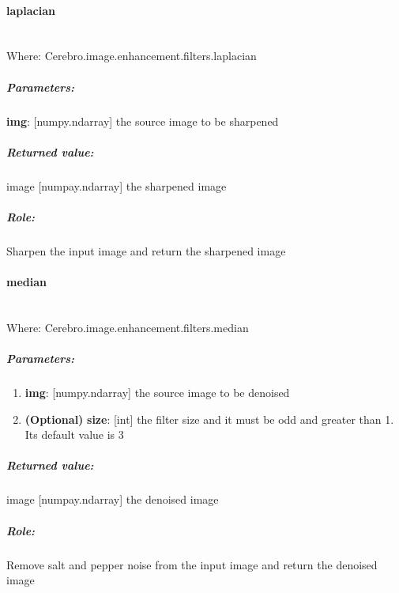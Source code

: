 \paragraph{laplacian} \mbox{} \\
Where: Cerebro.image.enhancement.filters.laplacian
\subparagraph{Parameters:}
\begin{changemargin}{1cm}{0cm}
	\textbf{img}: [numpy.ndarray] the source image to be sharpened
\end{changemargin}

\subparagraph{Returned value:}
\begin{changemargin}{1cm}{0cm}
	image [numpay.ndarray] the sharpened image
\end{changemargin}

\subparagraph{Role:}
\begin{changemargin}{1cm}{0cm}
	Sharpen the input image and return the sharpened image
\end{changemargin}


\paragraph{median} \mbox{} \\
Where: Cerebro.image.enhancement.filters.median
\subparagraph{Parameters:}
\begin{changemargin}{0.5cm}{0cm}
	\begin{enumerate}
		\item \textbf{img}: [numpy.ndarray] the source image to be denoised
		\item \textbf{(Optional)} \textbf{size}: [int] the filter size and it must be odd and greater than 1. Its default value is 3
	\end{enumerate}
\end{changemargin}

\subparagraph{Returned value:}
\begin{changemargin}{1cm}{0cm}
	image [numpay.ndarray] the denoised image
\end{changemargin}

\subparagraph{Role:}
\begin{changemargin}{1cm}{0cm}
 	Remove salt and pepper noise from the input image and return the denoised image
\end{changemargin}

 	
